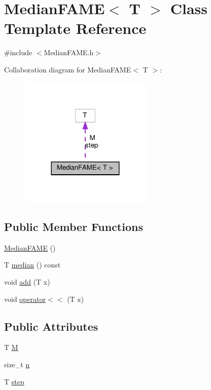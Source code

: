 \hypertarget{class_median_f_a_m_e}{}\section{Median\+F\+A\+ME$<$ T $>$ Class Template Reference}
\label{class_median_f_a_m_e}


{\ttfamily \#include $<$Median\+F\+A\+M\+E.\+h$>$}



Collaboration diagram for Median\+F\+A\+ME$<$ T $>$\+:\nopagebreak
\begin{figure}[H]
\begin{center}
\leavevmode
\includegraphics[width=180pt]{class_median_f_a_m_e__coll__graph}
\end{center}
\end{figure}
\subsection*{Public Member Functions}
\begin{DoxyCompactItemize}
\item 
\hyperlink{class_median_f_a_m_e_a5f7fa4a3764af4fbf6586479b3c2af46}{Median\+F\+A\+ME} ()
\item 
T \hyperlink{class_median_f_a_m_e_a3649461af2073421813b132f9f6e740b}{median} () const
\item 
void \hyperlink{class_median_f_a_m_e_aaf2310a3e21e455605c0f9d3375a7e5c}{add} (T x)
\item 
void \hyperlink{class_median_f_a_m_e_a95e83a1782a9fd3b79610a2c58a58dfe}{operator$<$$<$} (T x)
\end{DoxyCompactItemize}
\subsection*{Public Attributes}
\begin{DoxyCompactItemize}
\item 
T \hyperlink{class_median_f_a_m_e_a30154005cf17855ab19266f568803174}{M}
\item 
size\+\_\+t \hyperlink{class_median_f_a_m_e_a0318b43dd3ae39b735a152c16ae4baec}{n}
\item 
T \hyperlink{class_median_f_a_m_e_a99c7b975965259ed4079c08836583732}{step}
\end{DoxyCompactItemize}


